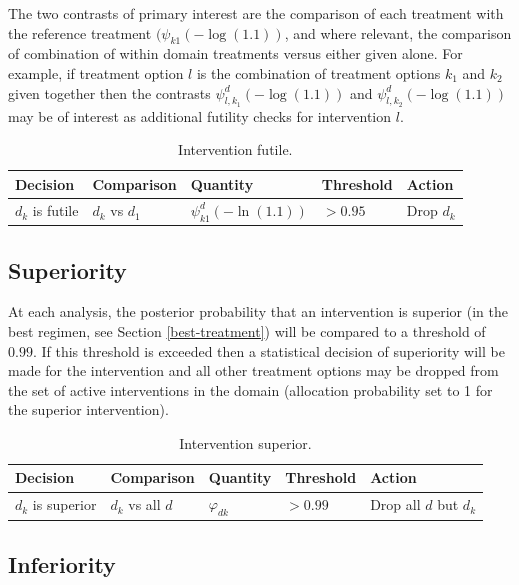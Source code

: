 \documentclass[
  11pt,
]{article}
\begin{document}
The two contrasts of primary interest are the comparison of each treatment with the reference treatment \((\psi_{k1}(-\log(1.1))\), and where relevant, the comparison of combination of within domain treatments versus either given alone. For example, if treatment option \(l\) is the combination of treatment options \(k_1\) and \(k_2\) given together then the contrasts \(\psi_{l,k_1}^d(-\log(1.1))\) and \(\psi_{l,k_2}^d(-\log(1.1))\) may be of interest as additional futility checks for intervention \(l\).

\begin{table}[H]

\caption{\label{tab:unnamed-chunk-3}Intervention futile.}
\centering
\begin{tabular}[t]{lllll}
\toprule
Decision & Comparison & Quantity & Threshold & Action\\
\midrule
$d_k$ is futile & $d_k$ vs $d_1$ & $\psi_{k1}^d(-\ln(1.1))$ & $>0.95$ & Drop $d_k$\\
\bottomrule
\end{tabular}
\end{table}

\hypertarget{superiority}{%
\subsection{Superiority}\label{superiority}}

At each analysis, the posterior probability that an intervention is superior (in the best regimen, see Section \ref{best-treatment}) will be compared to a threshold of \(0.99\).
If this threshold is exceeded then a statistical decision of superiority will be made for the intervention and all other treatment options may be dropped from the set of active interventions in the domain (allocation probability set to 1 for the superior intervention).

\begin{table}[H]

\caption{\label{tab:unnamed-chunk-4}Intervention superior.}
\centering
\begin{tabular}[t]{lllll}
\toprule
Decision & Comparison & Quantity & Threshold & Action\\
\midrule
$d_k$ is superior & $d_k$ vs all $d$ & $\varphi_{dk}$ & $>0.99$ & Drop all $d$ but $d_k$\\
\bottomrule
\end{tabular}
\end{table}

\hypertarget{inferiority}{%
\subsection{Inferiority}\label{inferiority}}
\end{document}
